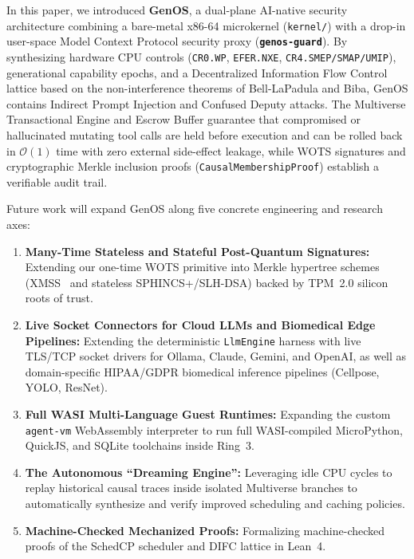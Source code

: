 \documentclass[10pt,journal,compsoc]{IEEEtran}
\theoremstyle{definition}
\begin{document}
In this paper, we introduced \textbf{GenOS}, a dual-plane AI-native security architecture combining a bare-metal x86-64 microkernel (\texttt{kernel/}) with a drop-in user-space Model Context Protocol security proxy (\textbf{\texttt{genos-guard}}). By synthesizing hardware CPU controls (\texttt{CR0.WP}, \texttt{EFER.NXE}, \texttt{CR4.SMEP/SMAP/UMIP}), generational capability epochs, and a Decentralized Information Flow Control lattice based on the non-interference theorems of Bell-LaPadula and Biba, GenOS contains Indirect Prompt Injection and Confused Deputy attacks. The Multiverse Transactional Engine and Escrow Buffer guarantee that compromised or hallucinated mutating tool calls are held before execution and can be rolled back in $\mathcal{O}(1)$ time with zero external side-effect leakage, while WOTS signatures and cryptographic Merkle inclusion proofs (\texttt{CausalMembershipProof}) establish a verifiable audit trail.

Future work will expand GenOS along five concrete engineering and research axes:
\begin{enumerate}
    \item \textbf{Many-Time Stateless and Stateful Post-Quantum Signatures:} Extending our one-time WOTS primitive into Merkle hypertree schemes (XMSS~\cite{buchmann2011xmss} and stateless SPHINCS+/SLH-DSA) backed by TPM~2.0 silicon roots of trust.
    \item \textbf{Live Socket Connectors for Cloud LLMs and Biomedical Edge Pipelines:} Extending the deterministic \texttt{LlmEngine} harness with live TLS/TCP socket drivers for Ollama, Claude, Gemini, and OpenAI, as well as domain-specific HIPAA/GDPR biomedical inference pipelines (Cellpose, YOLO, ResNet).
    \item \textbf{Full WASI Multi-Language Guest Runtimes:} Expanding the custom \texttt{agent-vm} WebAssembly interpreter to run full WASI-compiled MicroPython, QuickJS, and SQLite toolchains inside Ring~3.
    \item \textbf{The Autonomous ``Dreaming Engine'':} Leveraging idle CPU cycles to replay historical causal traces inside isolated Multiverse branches to automatically synthesize and verify improved scheduling and caching policies.
    \item \textbf{Machine-Checked Mechanized Proofs:} Formalizing machine-checked proofs of the SchedCP scheduler and DIFC lattice in Lean~4.
\end{enumerate}

\end{document}
